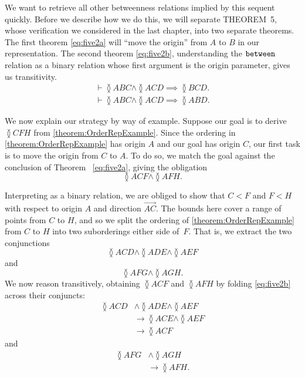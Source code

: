 We want to retrieve all other betweenness relations implied by this sequent quickly. Before we describe how we do this, we will separate THEOREM~5, whose verification we considered in the last chapter, into two separate theorems. The first theorem \eqref{eq:five2a} will ``move the origin'' from $A$ to $B$ in our representation. The second theorem \eqref{eq:five2b}, understanding the $\texttt{between}$ relation as a binary relation whose first argument is the origin parameter, gives us transitivity.
\begin{gather}
\label{eq:five2a}\vdash \between{A}{B}{C} \wedge \between{A}{C}{D} \implies \between{B}{C}{D}.\\
\label{eq:five2b}\vdash \between{A}{B}{C} \wedge \between{A}{C}{D} \implies \between{A}{B}{D}.
\end{gather}

We now explain our strategy by way of example. Suppose our goal is to derive $\between{C}{F}{H}$ from \eqref{theorem:OrderRepExample}. Since the ordering in \eqref{theorem:OrderRepExample} has origin $A$ and our goal has origin $C$, our first task is to move the origin from $C$ to $A$. To do so, we match the goal against the conclusion of Theorem~ \ref{eq:five2a}, giving the obligation
\begin{displaymath}
\between{A}{C}{F} \wedge \between{A}{F}{H}.
\end{displaymath}

Interpreting  as a binary relation, we are obliged to show that $C < F$ and $F < H$ with respect to origin $A$ and direction $\overrightarrow{AC}$. The bounds here cover a range of points from $C$ to $H$, and so we split the ordering of \eqref{theorem:OrderRepExample} from $C$ to $H$ into two suborderings either side of~$F$. That is, we extract the two conjunctions
\begin{displaymath}
\between{A}{C}{D} \wedge \between{A}{D}{E} \wedge\between{A}{E}{F}
\end{displaymath}
and
\begin{displaymath}
\between{A}{F}{G}\wedge\between{A}{G}{H}.
\end{displaymath}
We now reason transitively, obtaining $\between{A}{C}{F}$ and $\between{A}{F}{H}$ by folding \eqref{eq:five2b} across their conjuncts:
\begin{align*}
\between{A}{C}{D} &\wedge \between{A}{D}{E} \wedge\between{A}{E}{F}\\
&\longrightarrow \between{A}{C}{E} \wedge \between{A}{E}{F}\\
&\longrightarrow \between{A}{C}{F}
\end{align*}
and
\begin{align*}
\between{A}{F}{G} &\wedge \between{A}{G}{H}\\
&\longrightarrow \between{A}{F}{H}.
\end{align*}

